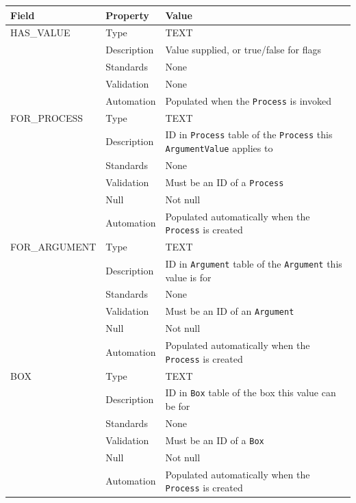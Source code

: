 \documentclass[
]{article}
\newcounter{none}
\begin{document}
{\def\LTcaptype{none} 
\begin{longtable}[]{@{}
  >{\raggedright\arraybackslash}p{}
  >{\raggedright\arraybackslash}p{}
  >{\raggedright\arraybackslash}p{}@{}}
\toprule\noalign{}
\begin{minipage}[b]{\linewidth}\raggedright
Field
\end{minipage} & \begin{minipage}[b]{\linewidth}\raggedright
Property
\end{minipage} & \begin{minipage}[b]{\linewidth}\raggedright
Value
\end{minipage} \\
\midrule\noalign{}
\endhead
\bottomrule\noalign{}
\endlastfoot
HAS\_VALUE & Type & TEXT \\
& Description & Value supplied, or true/false for flags \\
& Standards & None \\
& Validation & None \\
& Automation & Populated when the \texttt{Process} is invoked \\
FOR\_PROCESS & Type & TEXT \\
& Description & ID in \texttt{Process} table of the \texttt{Process}
this \texttt{ArgumentValue} applies to \\
& Standards & None \\
& Validation & Must be an ID of a \texttt{Process} \\
& Null & Not null \\
& Automation & Populated automatically when the \texttt{Process} is
created \\
FOR\_ARGUMENT & Type & TEXT \\
& Description & ID in \texttt{Argument} table of the \texttt{Argument}
this value is for \\
& Standards & None \\
& Validation & Must be an ID of an \texttt{Argument} \\
& Null & Not null \\
& Automation & Populated automatically when the \texttt{Process} is
created \\
BOX & Type & TEXT \\
& Description & ID in \texttt{Box} table of the box this value can be
for \\
& Standards & None \\
& Validation & Must be an ID of a \texttt{Box} \\
& Null & Not null \\
& Automation & Populated automatically when the \texttt{Process} is
created \\
\end{longtable}
}
\end{document}
